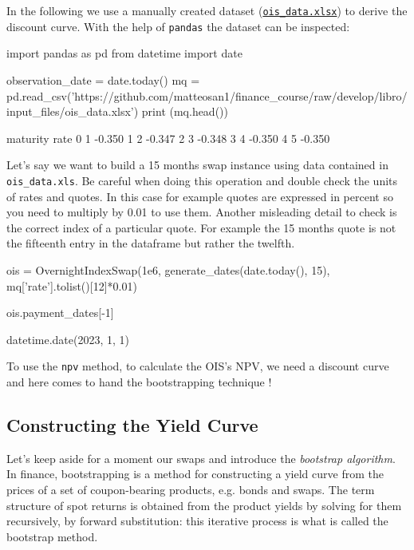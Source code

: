 In the following we use a manually created dataset (\href{https://github.com/matteosan1/finance_course/raw/develop/libro/input_files/ois_data.xlsx'}{\texttt{ois\_data.xlsx}}) to derive the discount curve. With the help of \texttt{pandas} the dataset can be inspected:

\begin{ipython}
import pandas as pd
from datetime import date

observation_date = date.today()
mq = pd.read_csv('https://github.com/matteosan1/finance_course/raw/develop/libro/input_files/ois_data.xlsx')
print (mq.head())
\end{ipython}
\begin{ioutput}
 maturity   rate
0       1 -0.350
1       2 -0.347
2       3 -0.348
3       4 -0.350
4       5 -0.350
\end{ioutput}

Let's say we want to build a 15 months swap instance using data contained in \texttt{ois\_data.xls}. Be careful when doing this
operation and double check the units of rates and quotes. In this case for example quotes are expressed in percent so you need to multiply by 0.01 to use them. Another misleading detail to check is the correct index of a particular quote. For example the 15 months quote is not the fifteenth entry in the dataframe but rather the twelfth.

\begin{ipython}
ois = OvernightIndexSwap(1e6,
                         generate_dates(date.today(), 15),
                         mq['rate'].tolist()[12]*0.01)

ois.payment_dates[-1]
\end{ipython}
\begin{ioutput}
datetime.date(2023, 1, 1)
\end{ioutput}

To use the \texttt{npv} method, to calculate the OIS's NPV, we need a discount curve and here comes to hand the bootstrapping technique !

\subsection{Constructing the Yield Curve}
\label{the-bootstrapping-technique}

Let's keep aside for a moment our swaps and introduce the \emph{bootstrap algorithm}. In finance, bootstrapping is a method for constructing a yield curve from the prices of a set of coupon-bearing products, e.g. bonds and swaps. The term structure of spot returns is obtained from the product yields by solving for them recursively, by forward substitution: this iterative process is what is called the bootstrap method. 

